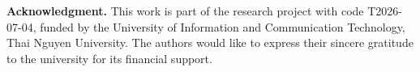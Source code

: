 \documentclass[runningheads]{svproc}
\begin{document}
\noindent\textbf{Acknowledgment.} This work is part of the research project with code T2026-07-04, funded by the University of Information and Communication Technology, Thai Nguyen University. The authors would like to express their sincere gratitude to the university for its financial support.


\footnotesize
\let\OLDthebibliography\thebibliography
\renewcommand\thebibliography[1]{%
  \OLDthebibliography{#1}%
  \setlength{\parskip}{0pt}%
  \setlength{\itemsep}{0pt}%
}



\end{document}
